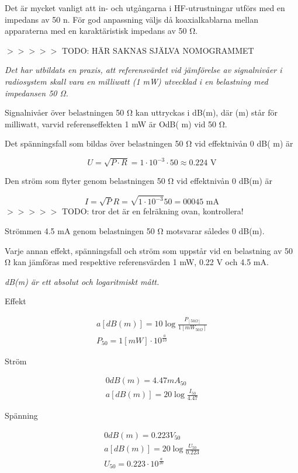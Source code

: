 Det är mycket vanligt att in- och utgångarna i HF-utrustningar utförs
med en impedans av 50 n. För god anpassning väljs då koaxialkablarna
mellan apparaterna med en karaktäristisk impedans av 50 Ω.

$>>>>>$ TODO: HÄR SAKNAS SJÄLVA NOMOGRAMMET

\emph{Det har utbildats en praxis, att referensvärdet vid jämförelse
  av signalnivåer i radiosystem skall vara en milliwatt (1 mW)
  utvecklad i en belastning med impedansen 50 Ω.}

Signalnivåer över belastningen 50 Ω kan uttryckas i dB(m), där (m)
står för milliwatt, varvid referenseffekten 1 mW är OdB( m) vid 50 Ω.

Det spänningsfall som bildas över belastningen 50 Ω vid effektnivån 0
dB( m) är

\[U = \sqrt{P\cdot R} = 1\cdot 10^{-3} \cdot 50 \approx 0.224 \text{ V}\]

Den ström som flyter genom belastningen 50 Ω vid effektnivån 0 dB(m)
är

\[
I = \sqrt{P}{R} = \sqrt{1\cdot 10^{-3}}{50} = 00045 \text{ mA}
\]
$>>>>>$ TODO: tror det är en felräkning ovan, kontrollera!

Strömmen 4.5 mA genom belastningen 50 Ω motsvarar således 0 dB(m).

Varje annan effekt, spänningsfall och ström som uppstår vid en
belastning av 50 Ω kan jämföras med respektive referensvärden 1 mW,
0.22 V och 4.5 mA.

\emph{dB(m) är ett absolut och logaritmiskt mått.}

Effekt

\begin{gather*}
  a [dB(m)] = 10 \log\frac{P_{[50Ω]}}{1[mW_{50Ω}]} \\
  P_{50} = 1 [mW] \cdot 10^{\frac{a}{10}}
\end{gather*}

Ström

\begin{gather*}
  0 dB(m) = 4.47 mA_{50} \\
  a [dB(m)] = 20 \log\frac{I_{50}}{4.47}
\end{gather*}

Spänning

\begin{gather*}
  0 dB(m) = 0.223 V_{50} \\
  a [dB(m)] = 20 \log\frac{U_{50}}{0.223} \\
  U_{50} = 0.223 \cdot 10^{\frac{a}{20}}
\end{gather*}

